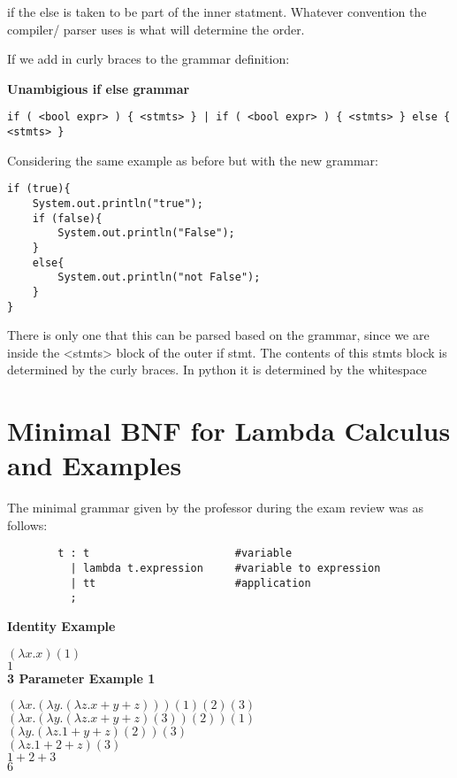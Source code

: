 \documentclass[11pt]{article}
\begin{document}
if the else is taken to be part of the inner statment.  Whatever convention the
compiler/ parser uses is what will determine the order.

If we add in curly braces to the grammar definition:

\textbf{Unambigious if else grammar}
\begin{lstlisting}[style=MyC++]
if ( <bool expr> ) { <stmts> } | if ( <bool expr> ) { <stmts> } else { <stmts> }
\end{lstlisting}


Considering the same example as before but with the new grammar:



\begin{lstlisting}[style=MyC++]
if (true){
    System.out.println("true");
    if (false){
        System.out.println("False");
    }
    else{
        System.out.println("not False");
    }
}
\end{lstlisting}



There is only one that this can be parsed based on the grammar, since we are
inside the <stmts> block of the outer if stmt.  The contents of this stmts
block is determined by the curly braces.  In python it is determined by the
whitespace



\newpage
\section{Minimal BNF for Lambda Calculus and Examples}

The minimal grammar given by the professor during the exam review was as
follows:\\
\begin{lstlisting}
        t : t                       #variable
          | lambda t.expression     #variable to expression
          | tt                      #application
          ;
\end{lstlisting}


\noindent
\textbf{Identity Example}


$(\lambda x.x)(1)$\\
\indent
$1$\\


\noindent
\textbf{3 Parameter Example 1}


$(\lambda x.(\lambda y.(\lambda z.x + y + z)))(1)(2)(3)$\\
\indent
$(\lambda x.(\lambda y.(\lambda z.x + y + z)(3))(2))(1)$\\
\indent
$(\lambda y.(\lambda z.1 + y + z)(2))(3)$\\
\indent
$(\lambda z.1 + 2 + z)(3)$\\
\indent
$1 + 2 + 3$\\
\indent
$6$\\
\end{document}
